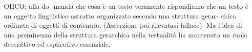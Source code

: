 
OHCO: alla do- manda che cosa è un testo veramente rispondiamo che un testo è un oggetto linguistico astratto organizzato secondo una struttura gerar- chica ordinata di oggetti di contenuto. (Asserzione poi rilevatasi fallace). Ma l’idea di una preminenza della struttura gerarchica nella testualità ha mantenuto un ruolo descrittivo ed esplicativo essenziale.